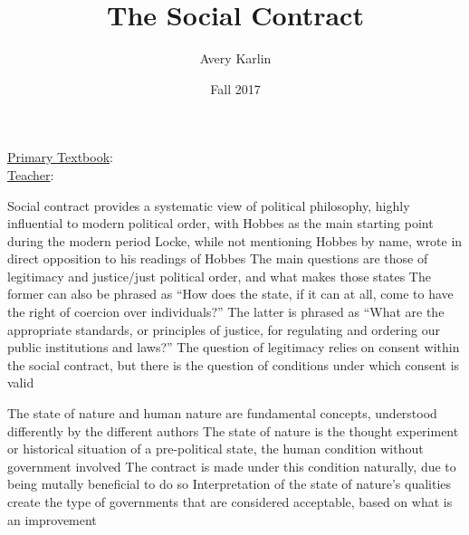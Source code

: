 \documentclass[11 pt, twoside]{article}
\newenvironment{outline*}
{
	\begin{outline}[enumerate]
	}
	{\end{outline}
}
\begin{document}
\title{The Social Contract}
\author{Avery Karlin}
\date{Fall 2017}
\newcommand{\textbook}{}
\newcommand{\teacher}{}

\maketitle
\newpage
\hypertarget{content}{\tableofcontents}
\vspace{11pt}
\noindent
\underline{Primary Textbook}: \textbook\\
\underline{Teacher}: \teacher
\newpage

\begin{outline*}
\1 Social contract provides a systematic view of political philosophy, highly influential to modern political order, with Hobbes as the main starting point during the modern period
	\2 Locke, while not mentioning Hobbes by name, wrote in direct opposition to his readings of Hobbes
\1 The main questions are those of legitimacy and justice/just political order, and what makes those states
	\2 The former can also be phrased as ``How does the state, if it can at all, come to have the right of coercion over individuals?''
	\2 The latter is phrased as ``What are the appropriate standards, or principles of justice, for regulating and ordering our public institutions and laws?''
\1 The question of legitimacy relies on consent within the social contract, but there is the question of conditions under which consent is valid

\1 The state of nature and human nature are fundamental concepts, understood differently by the different authors
	\2 The state of nature is the thought experiment or historical situation of a pre-political state, the human condition without government involved
		\3 The contract is made under this condition naturally, due to being mutally beneficial to do so
		\3 Interpretation of the state of nature's qualities create the type of governments that are considered acceptable, based on what is an improvement


\end{outline*}
\end{document}
